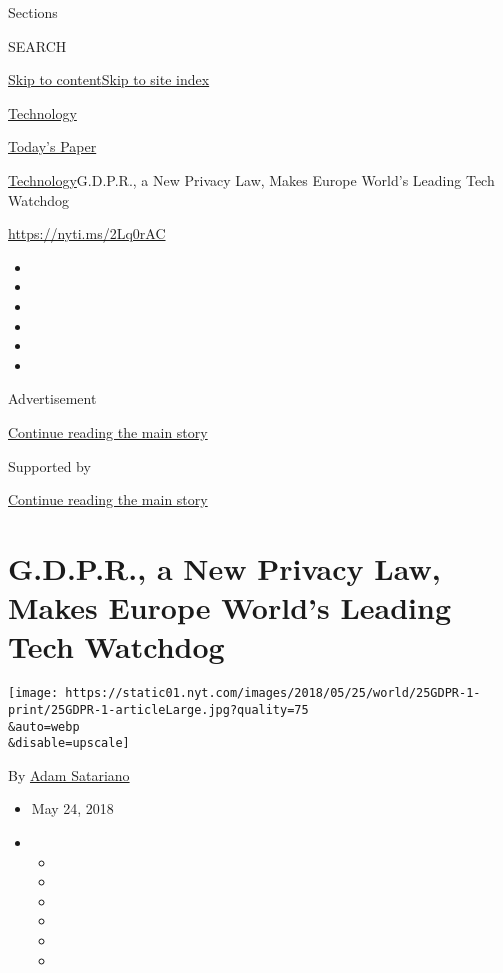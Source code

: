 Sections

SEARCH

\protect\hyperlink{site-content}{Skip to
content}\protect\hyperlink{site-index}{Skip to site index}

\href{https://www.nytimes.com/section/technology}{Technology}

\href{https://myaccount.nytimes.com/auth/login?response_type=cookie\&client_id=vi}{}

\href{https://www.nytimes.com/section/todayspaper}{Today's Paper}

\href{/section/technology}{Technology}\textbar{}G.D.P.R., a New Privacy
Law, Makes Europe World's Leading Tech Watchdog

\url{https://nyti.ms/2Lq0rAC}

\begin{itemize}
\item
\item
\item
\item
\item
\item
\end{itemize}

Advertisement

\protect\hyperlink{after-top}{Continue reading the main story}

Supported by

\protect\hyperlink{after-sponsor}{Continue reading the main story}

\hypertarget{gdpr-a-new-privacy-law-makes-europe-worlds-leading-tech-watchdog}{%
\section{G.D.P.R., a New Privacy Law, Makes Europe World's Leading Tech
Watchdog}\label{gdpr-a-new-privacy-law-makes-europe-worlds-leading-tech-watchdog}}

\texttt{[image: https://static01.nyt.com/images/2018/05/25/world/25GDPR-1-print/25GDPR-1-articleLarge.jpg?quality=75\\\&auto=webp\\\&disable=upscale]}

By \href{https://www.nytimes.com/by/adam-satariano}{Adam Satariano}

\begin{itemize}
\item
  May 24, 2018
\item
  \begin{itemize}
  \item
  \item
  \item
  \item
  \item
  \item
  \end{itemize}
\end{itemize}

